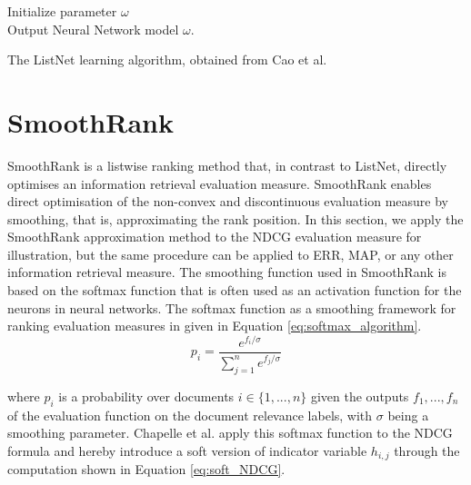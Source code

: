 \LinesNumbered
\begin{algorithm}[H]
 Initialize parameter $\omega$\\
 Output Neural Network model $\omega$.
 \caption{The ListNet learning algorithm, obtained from Cao et al. \cite{Cao2007}}
 \label{alg:listnet}
\end{algorithm}

\section{SmoothRank}
SmoothRank \cite{Chapelle2010} is a listwise ranking method that, in contrast to ListNet, directly optimises an information retrieval evaluation measure. SmoothRank enables direct optimisation of the non-convex and discontinuous evaluation measure by smoothing, that is, approximating the rank position. In this section, we apply the SmoothRank approximation method to the \ac{NDCG} evaluation measure for illustration, but the same procedure can be applied to \ac{ERR}, \ac{MAP}, or any other information retrieval measure. The smoothing function used in SmoothRank is based on the softmax function \cite{Bridle1990} that is often used as an activation function for the neurons in neural networks. The softmax function as a smoothing framework for ranking evaluation measures in given in Equation \ref{eq:softmax_algorithm}.
\begin{equation}
p_i = \frac{e^{f_i/\sigma}}{\sum\nolimits_{j=1}^{n}e^{f_j/\sigma}}
\label{eq:softmax_algorithm}
\end{equation}

where $p_i$ is a probability over documents $i \in \{1,...,n\}$ given the outputs $f_1,...,f_n$ of the evaluation function on the document relevance labels, with $\sigma$ being a smoothing parameter. Chapelle et al. \cite{Chapelle2010} apply this softmax function to the \ac{NDCG} formula and hereby introduce a soft version of indicator variable $h_{i,j}$ through the computation shown in Equation \ref{eq:soft_NDCG}.

